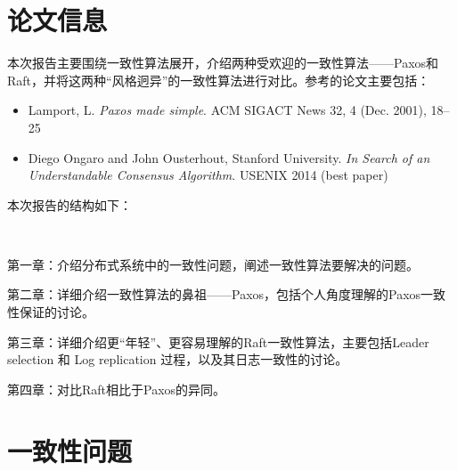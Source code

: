 \documentclass[UTF8]{article}
\begin{document}
    
%
%


\section*{论文信息}
    
本次报告主要围绕一致性算法展开，介绍两种受欢迎的一致性算法——Paxos和Raft，并将这两种“风格迥异”的一致性算法进行对比。参考的论文主要包括：

\begin{itemize}
    \item Lamport, L. \emph{Paxos made simple}. ACM SIGACT News 32, 4 (Dec. 2001), 18–25
    \item Diego Ongaro and John Ousterhout, Stanford University. \emph{In Search of an Understandable Consensus Algorithm}. USENIX 2014 (best paper)
\end{itemize}

本次报告的结构如下：
\begin{list}{~}{~}
	\item 第一章：介绍分布式系统中的一致性问题，阐述一致性算法要解决的问题。
	\item 第二章：详细介绍一致性算法的鼻祖——Paxos，包括个人角度理解的Paxos一致性保证的讨论。
	\item 第三章：详细介绍更“年轻”、更容易理解的Raft一致性算法，主要包括Leader selection 和 Log replication 过程，以及其日志一致性的讨论。
	\item 第四章：对比Raft相比于Paxos的异同。
\end{list}
    
%    
%


    
\section{一致性问题}
\end{document}
